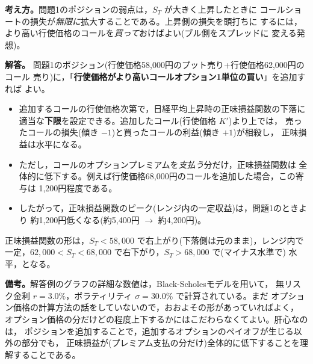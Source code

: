 \begin{answerbox}
\textbf{考え方。}問題1のポジションの弱点は，$S_T$ が大きく上昇したときに
コールショートの損失が\emph{無限に}拡大することである。上昇側の損失を頭打ちに
するには，より高い行使価格のコールを\emph{買って}おけばよい(ブル側をスプレッドに
変える発想)。

\medskip
\textbf{解答。}
問題1のポジション(行使価格58,000円のプット売り+行使価格62,000円のコール
売り)に，「\textbf{行使価格がより高いコールオプション1単位の買い}」を追加すれば
よい。

\begin{itemize}
\item 追加するコールの行使価格次第で，日経平均上昇時の正味損益関数の下落に
適当な\textbf{下限}を設定できる。追加したコール(行使価格 $K'$)より上では，
売ったコールの損失(傾き $-1$)と買ったコールの利益(傾き $+1$)が相殺し，
正味損益は水平になる。
\item ただし，コールのオプションプレミアムを\emph{支払う}分だけ，正味損益関数は
全体的に低下する。例えば行使価格68,000円のコールを追加した場合，この寄与は
1,200円程度である。
\item したがって，正味損益関数のピーク(レンジ内の一定収益)は，問題1のときより
約1,200円低くなる(約5,400円 $\to$ 約4,200円)。
\end{itemize}

正味損益関数の形は，$S_T<58{,}000$ で右上がり(下落側は元のまま)，レンジ内で
一定，$62{,}000<S_T<68{,}000$ で右下がり，$S_T>68{,}000$ で(マイナス水準で)
水平，となる。

\medskip
\textbf{備考。}解答例のグラフの詳細な数値は，Black-Scholesモデルを用いて，
無リスク金利 $r=3.0\%$，ボラティリティ $\sigma=30.0\%$ で計算されている。まだ
オプション価格の計算方法の話をしていないので，おおよその形があっていればよく，
オプション価格の分だけどの程度上下するかにはこだわらなくてよい。肝心なのは，
ポジションを追加することで，追加するオプションのペイオフが生じる以外の部分でも，
正味損益が(プレミアム支払の分だけ)全体的に低下することを理解することである。
\end{answerbox}
